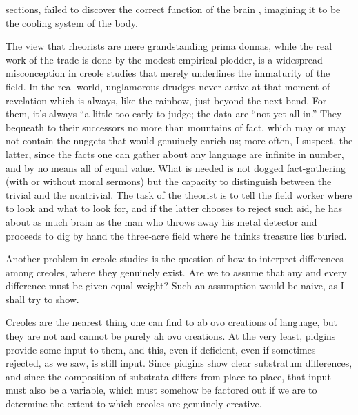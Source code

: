 sections, failed to discover the correct function of the brain , imagining it to be the cooling system of the body.{\textquotedbl}

The view that rheorists are mere grandstanding prima donnas, while the real work of the trade is done by the modest empirical plodder, is a widespread misconception in creole studies that merely underlines the immaturity of the field. In the real world, unglamorous drudges never artive at that moment of revelation which is always, like the rainbow, just beyond the next bend. For them, it's always ``a little too early to judge{\textquotedbl}; the data are ``not yet all in.'' They bequeath to their successors no more than mountains of fact, which may or may not contain the nuggets that would genuinely enrich us; more often, I suspect, the latter, since the facts one can gather about any language are infinite in number, and by no means all of equal value. What is needed is not dogged fact-gathering (with or without moral sermons) but the capacity to distinguish between the trivial and the nontrivial. The task of the theorist is to tell the field worker where to look and what to look for, and if the latter chooses to reject such aid, he has about as much brain as the man who throws away his metal detector and proceeds to dig by hand the three-acre field where he thinks treasure lies buried.

Another problem in creole studies is the question of how to interpret differences among creoles, where they genuinely exist. Are we to assume that any and every difference must be given equal weight? Such an assumption would be naive, as I shall try to show.

Creoles are the nearest thing one can find to ab ovo creations of language, but they are not and cannot be purely ah ovo creations. At the very least, pidgins provide some input to them, and this, even if deficient, even if sometimes rejected, as we saw, is still input. Since pidgins show clear substratum differences, and since the composition of substrata differs from place to place, that input must also be a variable, which must somehow be factored out if we are to determine the extent to which creoles are genuinely creative.


